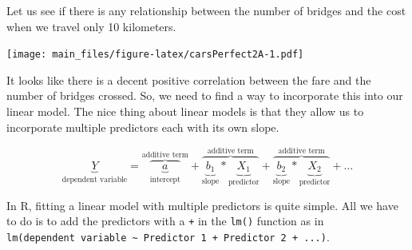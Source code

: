 \documentclass[
]{book}
\newenvironment{Shaded}{\begin{snugshade}}{\end{snugshade}}
\newcommand{\FunctionTok}[1]{\textcolor[rgb]{0.13,0.29,0.53}{\textbf{#1}}}
\newcommand{\NormalTok}[1]{#1}
\newcommand{\OtherTok}[1]{\textcolor[rgb]{0.56,0.35,0.01}{#1}}
\newcommand{\SpecialCharTok}[1]{\textcolor[rgb]{0.81,0.36,0.00}{\textbf{#1}}}
\begin{document}
Let us see if there is any relationship between the number of bridges and the cost when we travel only 10 kilometers.

\texttt{[image: main\_files/figure-latex/carsPerfect2A-1.pdf]}

It looks like there is a decent positive correlation between the fare and the number of bridges crossed. So, we need to find a way to incorporate this into our linear model. The nice thing about linear models is that they allow us to incorporate multiple predictors each with its own slope.

\[ \underbrace{Y}_{\text{dependent variable}} =
            \overbrace{\underbrace{a}_{\text{intercept}}}^{\text{additive term}} + 
            \overbrace{\underbrace{b_1}_{\text{slope}} * \underbrace{X_{1}}_{\text{predictor}}}^{\text{additive term}} + 
            \overbrace{\underbrace{b_2}_{\text{slope}} * \underbrace{X_{2} }_{\text{predictor}}}^{\text{additive term}} +  
            \ldots\]

In R, fitting a linear model with multiple predictors is quite simple. All we have to do is to add the predictors with a \texttt{+} in the \texttt{lm()} function as in \texttt{lm(dependent\ variable\ \textasciitilde{}\ Predictor\ 1\ +\ Predictor\ 2\ +\ ...)}.

\begin{Shaded}
\end{Shaded}

\begin{Shaded}
\end{Shaded}
\end{document}
